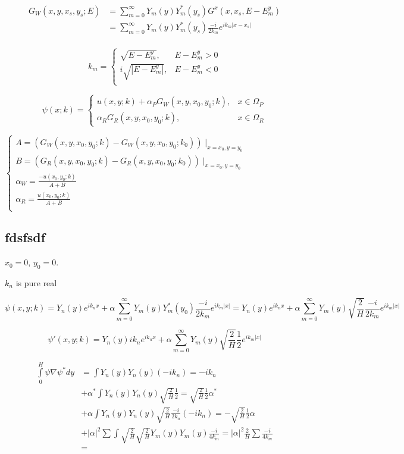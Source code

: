 \documentclass[12pt, a4paper]{article}
\begin{document}
\begin{align*}
G_W(x, y, x_s, y_s; E)
&= \sum\limits_{m = 0}^\infty Y_m(y) Y_m^*(y_s) G^x(x, x_s, E - E^y_m) \\
&= \sum\limits_{m = 0}^\infty Y_m(y) Y_m^*(y_s) \frac{-i}{2 k_m} e^{i k_m |x - x_s|} \\
\end{align*}

$$k_m =
\begin{cases}
\sqrt{E - E^y_m}, & E - E^y_m > 0 \\
i \sqrt{|E - E^y_m|}, & E - E^y_m < 0 \\
\end{cases}$$


$$\psi(x; k) =
\begin{cases}
u(x, y; k) + \alpha_P G_W(x, y, x_0, y_0; k), & x \in \Omega_P \\
\alpha_R G_R(x, y, x_0, y_0; k), & x \in \Omega_R
\end{cases}
$$

$\begin{cases}
A = (G_W(x, y, x_0, y_0; k) - G_W(x, y, x_0, y_0; k_0)) \mid_{x = x_0, y = y_0} \\
B = (G_R(x, y, x_0, y_0; k) - G_R(x, y, x_0, y_0; k_0)) \mid_{x = x_0, y = y_0} \\
\alpha_W = \frac{-u(x_0, y_0; k)}{A + B} \\
\alpha_R = \frac{u(x_0, y_0; k)}{A + B} \\
\end{cases}$

\subsection{fdsfsdf}
$x_0 = 0$, $y_0 = 0$.

$k_n$ is pure real

$$\psi(x, y; k) = Y_n(y) e^{i k_n x} + \alpha \sum\limits_{m = 0}^\infty Y_m(y) Y_m^*(y_0) \frac{-i}{2 k_m} e^{i k_m |x|} = Y_n(y) e^{i k_n x} + \alpha \sum\limits_{m = 0}^\infty Y_m(y) \sqrt{\frac{2}{H}} \frac{-i}{2 k_m} e^{i k_m |x|} $$

$$\psi'(x, y; k) = Y_n(y) i k_n e^{i k_n x} + \alpha \sum\limits_{m = 0}^\infty Y_m(y) \sqrt{\frac{2}{H}} \frac{1}{2 } e^{i k_m |x|}$$


\begin{align*}
\int\limits_{0}^H \psi \nabla \psi^* dy &=
   \int Y_n(y) Y_n(y) (-i k_n) = -i k_n \\
&+ \alpha^* \int Y_n(y) Y_n(y) \sqrt{\frac{2}{H}} \frac{1}{2}  = \sqrt{\frac{2}{H}}\frac{1}{2} \alpha^* \\
&+ \alpha \int Y_n(y) Y_n(y) \sqrt{\frac{2}{H}} \frac{-i}{2k_n}(-i k_n) =  - \sqrt{\frac{2}{H}}\frac{1}{2} \alpha \\
&+ |\alpha|^2 \sum \int \sqrt{\frac{2}{H}} \sqrt{\frac{2}{H}} Y_m(y) Y_m(y) \frac{-i}{4 k_m} = |\alpha|^2 \frac{2}{H} \sum \frac{-i}{4 k_m}  \\
&= %
\end{align*}
\end{document}
